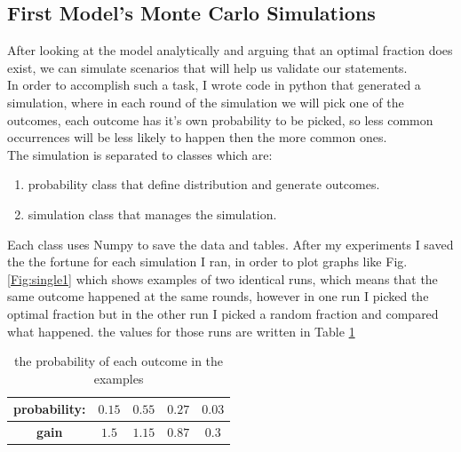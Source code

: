 \documentclass{article}
\begin{document}
	\subsection{First Model's Monte Carlo Simulations}
	After looking at the model analytically and arguing that an optimal fraction does exist, we can simulate scenarios that will help us validate our statements.\\
	In order to accomplish such a task, I wrote code in python that generated a simulation, where in each round of the simulation we will pick one of the outcomes, each outcome has it's own probability to be picked, so less common occurrences will be less likely to happen then the more common ones.\\
	The simulation is separated to classes which are:
	\begin{enumerate}
		\item probability class that define distribution and generate outcomes.
		\item simulation class that manages the simulation.
	\end{enumerate}
	Each class uses Numpy\cite{Numpy} to save the data and tables. After my experiments I saved the the fortune for each simulation I ran, in order to plot graphs like Fig.\ref{Fig:single1} which shows examples of two identical runs, which means that the same outcome happened at the same rounds, however in one run I picked the optimal fraction but in the other run I picked a random fraction and compared what happened. the values for those runs are written in Table \ref{single:prob} \\
	\begin{table}[!h]
		\centering\begin{tabular}{|c||c|c|c|c|}
			\hline
			\textbf{probability:} & $0.15$ & $0.55$ & $0.27$ & $0.03$ \\ 
			\hline
			\textbf{gain}  & $1.5$ & $1.15$ & $0.87$ & $0.3$  \\
			\hline
		\end{tabular}
		\caption{the probability of each outcome in the examples}
		\label{single:prob}
	\end{table}
\end{document}
